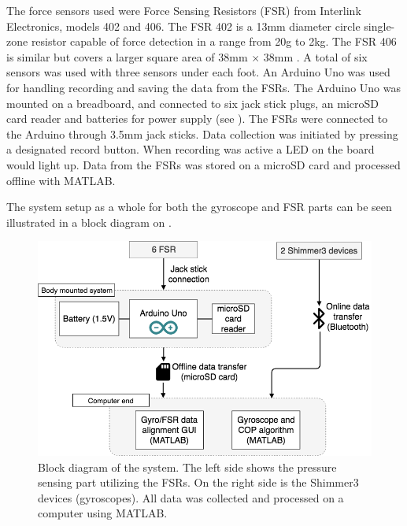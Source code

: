 The force sensors used were Force Sensing Resistors (FSR) from Interlink Electronics, models 402 and 406. The FSR 402 is a 13mm diameter circle single-zone resistor capable of force detection in a range from 20g to 2kg. The FSR 406 is similar but covers a larger square area of 38mm $\times$ 38mm \cite{IE400}. A total of six sensors was used with three sensors under each foot. 
An Arduino Uno was used for handling recording and saving the data from the FSRs. The Arduino Uno was mounted on a breadboard, and connected to six jack stick plugs, an microSD card reader and batteries for power supply (see ). The FSRs were connected to the Arduino through 3.5mm jack sticks. Data collection was initiated by pressing a designated record button. When recording was active a LED on the board would light up. Data from the FSRs was stored on a microSD card and processed offline with MATLAB.


The system setup as a whole for both the gyroscope and FSR parts can be seen illustrated in a block diagram on .

\begin{figure}[H]
	\includegraphics[width=.8\textwidth]{figures/heleSystemSetup}
	\caption{Block diagram of the system. The left side shows the pressure sensing part utilizing the FSRs. On the right side is the Shimmer3 devices (gyroscopes). All data was collected and processed on a computer using MATLAB.}
	\label{fig:heleSystemSetup}  %
\end{figure}


